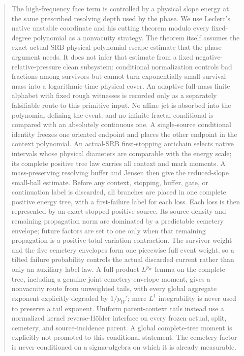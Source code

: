 \documentclass[11pt]{article}
\begin{document}
\begin{abstract}
The high-frequency face term is controlled by a physical slope energy at the
same prescribed resolving depth used by the phase.  We
use Leclerc's native unstable coordinate and his cutting theorem modulo every
fixed-degree polynomial as a nonvacuity strategy.  The theorem itself assumes
the exact actual-SRB physical polynomial escape estimate that the phase
argument needs.  It does not infer that estimate from a fixed
negative-relative-pressure clean subsystem: conditional normalization
controls bad fractions among survivors but cannot turn exponentially small
survival mass into a logarithmic-time physical cover.  An adaptive
full-mass finite alphabet with fixed rough witnesses is recorded only as a
separately falsifiable route to this primitive input.  No affine jet is absorbed into the polynomial
defining the event, and no infinite fractal conditional is compared with an
absolutely continuous one.  A single-source
conditional identity freezes one oriented endpoint and places the other
endpoint in the context polynomial.  An actual-SRB first-stopping antichain
selects native intervals whose physical diameters are comparable with the
energy scale; its complete positive tree law carries all context and mark moments.
A mass-preserving resolving buffer and Jensen then give the reduced-slope
small-ball estimate.  Before any context, stopping, buffer, gate, or
continuation label is discarded, all branches are placed in one complete
positive energy tree, with a first-failure label for each loss.  Each loss is
then represented by an exact stopped positive source.  Its source density and
remaining propagation norm are dominated by a predictable cemetery envelope;
future factors are set to one only when that remaining propagation is a
positive total-variation contraction.  The survivor weight and the five
cemetery envelopes form one piecewise full event weight, so a tilted failure
probability controls the actual discarded current rather than only an
auxiliary label law.  A full-product $L^{p_W}$ lemma on the complete tree,
including a genuine joint cemetery-envelope moment, gives a nonvacuity route from unweighted tails,
with every global aggregate exponent explicitly degraded by $1/p_W'$; mere
$L^1$ integrability is never used to preserve a tail exponent.  Uniform
parent-context tails instead use a normalized kernel reverse-H\"older
interface on every frozen actual, split, cemetery, and source-incidence
parent.  A global complete-tree moment is explicitly not promoted to this
conditional statement.  The cemetery factor
is never conditioned on a sigma-algebra on which it is already measurable.

\end{abstract}
\end{document}
